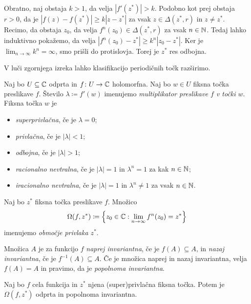 \begin{dokaz}
    Obratno, naj obstaja \(k > 1\), da velja \(|f' (z^*)| > k\). Podobno kot prej obstaja \(r > 0\), da je \(|f (z) - f (z^*)| \geq k |z - z^*|\) za vsak \(z \in \Delta (z^*, r)\) in \(z \neq z^*\). Recimo, da obstaja \(z_0\), da velja \(f^n (z_0) \in \Delta (z^*, r)\) za vsak \(n \in \mathbb N\). Tedaj lahko induktivno pokažemo, da velja \(|f^n (z_0) - z^*| \geq k^n |z_0 - z^*|\). Ker je \(\lim_{n \to \infty} k^n = \infty\), smo prišli do protislovja. Torej je \(z^*\) res odbojna.
\end{dokaz}

\noindent V luči zgornjega izreka lahko klasifikacijo periodičnih točk razširimo.

\begin{definicija}
    Naj bo \(U \subseteq \mathbb C\) odprta in \(f \colon U \to \mathbb C\) holomorfna. Naj bo \(w \in U\) fiksna točka preslikave \(f\). Število \(\lambda \coloneq f' (w)\) imenujemo \emph{multiplikator preslikave \(f\) v točki \(w\)}. Fiksna točka \(w\) je
    \begin{itemize}
        \item \emph{superprivlačna}, če je \(\lambda = 0\);
        \item \emph{privlačna}, če je \(|\lambda| < 1\);
        \item \emph{odbojna}, če je \(|\lambda| > 1\);
        \item \emph{racionalno nevtralna}, če je \(|\lambda| = 1\) in \(\lambda^n = 1\) za kak \(n \in \mathbb N\);
        \item \emph{iracionalno nevtralna}, če je \(|\lambda| = 1\) in \(\lambda^n \neq 1\) za vsak \(n \in \mathbb N\).
    \end{itemize}
\end{definicija}

\begin{definicija}
    Naj bo \(z^*\) fiksna točka preslikave \(f\). Množico
    \[\Omega (f, z^*) \coloneq \left\{ z_0 \in \mathbb C : \lim_{n \to \infty} f^n (z_0) = z^* \right\}\]
    imenujemo \emph{območje privlaka \(z^*\)}.
\end{definicija}

Množica \(A\) je za funkcijo \(f\) \emph{naprej invariantna}, če je \(f (A) \subseteq A\), in \emph{nazaj invariantna}, če je \(f^{-1} (A) \subseteq A\). Če je množica naprej in nazaj invariantna, velja \(f (A) = A\) in pravimo, da je \emph{popolnoma invariantna}.

\begin{izrek}
    Naj bo \(f\) cela funkcija in \(z^*\) njena (super)privlačna fiksna točka. Potem je \(\Omega (f, z^*)\) odprta in popolnoma invariantna.
\end{izrek}

